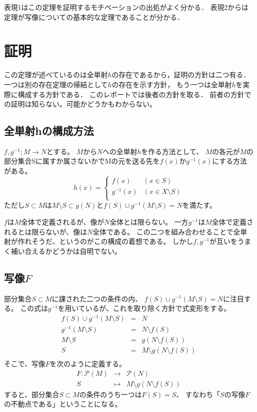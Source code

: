 \documentclass[a4j, 10pt]{jarticle}
\begin{document}
        表現1はこの定理を証明するモチベーションの出処がよく分かる．
        表現2からは定理が写像についての基本的な定理であることが分かる．

    \section{証明}
        この定理が述べているのは全単射$h$の存在であるから，証明の方針は二つ有る．
        一つは別の存在定理の帰結として$h$の存在を示す方針，
        もう一つは全単射$h$を実際に構成する方針である．
        このレポートでは後者の方針を取る．
        前者の方針での証明は知らない。可能かどうかもわからない。

        \subsection{全単射hの構成方法}
        $f, g^{-1}; M \to N$とする。
        $M$から$N$への全単射$h$を作る方法として、
        $M$の各元が$M$の部分集合Sに属すか属さないかでMの元を送る先を$f(x)$か$g^{-1}(x)$にする方法がある。
        \[
            h(x)=
            \begin{cases}
                f(x) & (x \in S) \\
                g^{-1}(x) & (x \in X \setminus S) \\
            \end{cases}
        \]
        ただし$S \subset M$は$M \setminus S \subset g(N)$と$f(S) \cup g^{-1}(M \setminus S)=N$を満たす。

        $f$は$M$全体で定義されるが、像が$N$全体とは限らない。
        一方$g^{-1}$は$M$全体で定義されるとは限らないが、像は$N$全体である。
        この二つを組み合わせることで全単射が作れそうだ、というのがこの構成の着想である。
        しかし$f, g^{-1}$が互いをうまく補い合えるかどうかは自明でない。

        \subsection{写像$F$}
            部分集合$S \subset M$に課された二つの条件の内、
            $f(S) \cup g^{-1}(M \setminus S)=N$に注目する。
            この式は$g^{-1}$を用いているが、これを取り除く方針で式変形をする。
            \begin{eqnarray*}
                f(S) \cup g^{-1}(M \setminus S)&=&N \\
                g^{-1}(M \setminus S)&=&N \setminus f(S) \\
                M \setminus S&=&g(N \setminus f(S)) \\
                S&=&M \setminus g(N \setminus f(S)) \\
            \end{eqnarray*}
            そこで、写像$F$を次のように定義する。
            \begin{eqnarray*}
                F : \mathcal{P}(M) &\to& \mathcal{P}(N) \\
                    S &\mapsto& M \setminus g(N \setminus f(S))
            \end{eqnarray*}
            すると、部分集合$S \subset M$の条件のうち一つは$F(S)=S$、
            すなわち「$S$の写像$F$の不動点である」ということになる。
\end{document}
